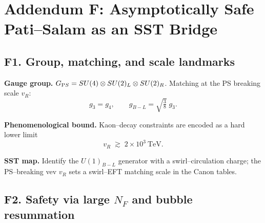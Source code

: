 \documentclass[11pt]{article}
\begin{document}
  \titlepageOpen

  \begin{abstract}


  \end{abstract}

  \titlepageClose
  \fi

  \ifdefined\standalonechapter
  \section{\papertitle}
  \else
  \fi


  \section*{Addendum F: Asymptotically Safe Pati–Salam as an SST Bridge}

      \subsection*{F1. Group, matching, and scale landmarks}

          \textbf{Gauge group.} \; $G_{\textrm PS}=SU(4)\otimes SU(2)_L\otimes SU(2)_R$.
          Matching at the PS breaking scale $v_R$:
          \begin{equation}
          g_3=g_4,\qquad
          g_{B-L}=\sqrt{\tfrac{3}{8}}\;g_3.
          \end{equation}

          \textbf{Phenomenological bound.} \; Kaon–decay constraints are encoded as a hard lower limit
          \begin{equation}
          v_R \;\gtrsim\; 2\times10^{3}\ \text{TeV}.
          \end{equation}

          \textbf{SST map.} \; Identify the $U(1)_{B-L}$ generator with a swirl–circulation charge; the PS–breaking vev $v_R$ sets a swirl–EFT matching scale in the Canon tables.

      \subsection*{F2. Safety via large $N_F$ and bubble resummation}
\end{document}

